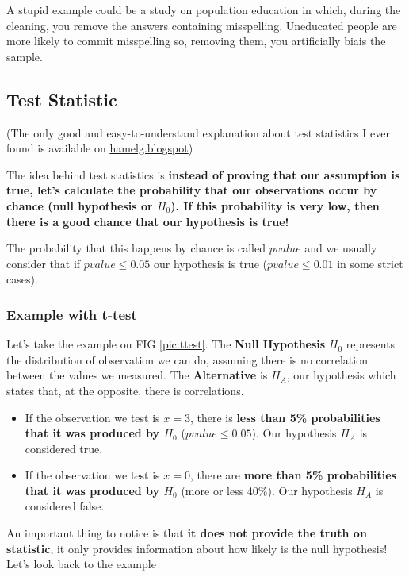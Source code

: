 A stupid example could be a study on population education in which, during the cleaning, you remove the answers containing misspelling. Uneducated people are more likely to commit misspelling so, removing them, you artificially biais the sample.

\subsection{Test Statistic}

(The only good and easy-to-understand explanation about test statistics I ever found is available on \href{http://hamelg.blogspot.ch/2015/11/python-for-data-analysis-part-24.html?view=flipcard}{hamelg.blogspot})

The idea behind test statistics is \textbf{instead of proving that our assumption is true, let's calculate the probability that our observations occur by chance (null hypothesis or $H_0$). If this probability is very low, then there is a good chance that our hypothesis is true!}

The probability that this happens by chance is called $pvalue$ and we usually consider that if $pvalue \leq 0.05$ our hypothesis is true ($pvalue \leq 0.01$ in some strict cases).

\subsubsection{Example with t-test}

Let's take the example on FIG \ref{pic:ttest}. The \textbf{Null Hypothesis} $H_0$ represents the distribution of observation we can do, assuming there is no correlation between the values we measured. The \textbf{Alternative} is $H_A$, our hypothesis which states that, at the opposite, there is correlations.
\begin{itemize}
	\item If the observation we test is $x=3$, there is \textbf{less than 5\% probabilities that it was produced by $H_0$} ($pvalue \leq 0.05$). Our hypothesis $H_A$ is considered true.

	\item If the observation we test is $x=0$, there are \textbf{more than 5\% probabilities that it was produced by $H_0$} (more or less 40\%). Our hypothesis $H_A$ is considered false.
\end{itemize}

{\color{red} An important thing to notice is that \textbf{it does not provide the truth on statistic}, it only provides information about how likely is the null hypothesis! Let's look back to the example}

